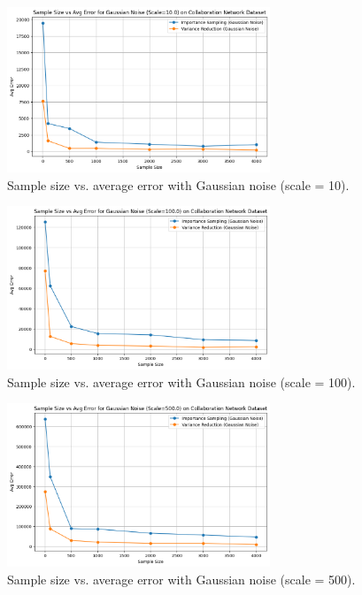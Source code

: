 \documentclass[11pt]{article}
\begin{document}
\begin{figure}[H]
    \centering
    \includegraphics[width=0.7\textwidth]{plots/simulated/percent_error_vs_sample_size_comparison_gaussian_10.0.png}
    \caption{Sample size vs. average error with Gaussian noise (scale = 10).}
    \label{fig:gaussian_noise_10}
\end{figure}

\begin{figure}[H]
    \centering
    \includegraphics[width=0.7\textwidth]{plots/simulated/percent_error_vs_sample_size_comparison_gaussian_100.0.png}
    \caption{Sample size vs. average error with Gaussian noise (scale = 100).}
    \label{fig:gaussian_noise_100}
\end{figure}

\begin{figure}[H]
    \centering
    \includegraphics[width=0.7\textwidth]{plots/simulated/percent_error_vs_sample_size_comparison_gaussian_500.0.png}
    \caption{Sample size vs. average error with Gaussian noise (scale = 500).}
    \label{fig:gaussian_noise_500}
\end{figure}
\end{document}
